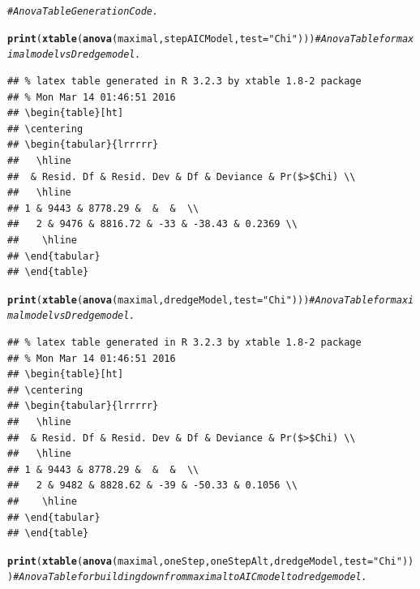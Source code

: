 \documentclass{article}\usepackage[]{graphicx}\usepackage[]{color}
\makeatletter
\newcommand{\hlstr}[1]{\textcolor[rgb]{0.192,0.494,0.8}{#1}}%
\newcommand{\hlcom}[1]{\textcolor[rgb]{0.678,0.584,0.686}{\textit{#1}}}%
\newcommand{\hlstd}[1]{\textcolor[rgb]{0.345,0.345,0.345}{#1}}%
\newcommand{\hlkwc}[1]{\textcolor[rgb]{0.333,0.667,0.333}{#1}}%
\newcommand{\hlkwd}[1]{\textcolor[rgb]{0.737,0.353,0.396}{\textbf{#1}}}%
\newenvironment{kframe}{%
 \def\at@end@of@kframe{}%
 \ifinner\ifhmode%
  \def\at@end@of@kframe{\end{minipage}}%
  \begin{minipage}{\columnwidth}%
 \fi\fi%
 \def\FrameCommand##1{\hskip\@totalleftmargin \hskip-\fboxsep
 \colorbox{shadecolor}{##1}\hskip-\fboxsep
     \hskip-\linewidth \hskip-\@totalleftmargin \hskip\columnwidth}%
 \MakeFramed {\advance\hsize-\width
   \@totalleftmargin\z@ \linewidth\hsize
   \@setminipage}}%
 {\par\unskip\endMakeFramed%
 \at@end@of@kframe}
\newenvironment{knitrout}{}{} %
\makeatother
\begin{document}
\begin{knitrout}
\color{fgcolor}\begin{kframe}
\begin{alltt}
\hlcom{#Anova Table Generation Code. }

\hlkwd{print}\hlstd{(}\hlkwd{xtable}\hlstd{(}\hlkwd{anova}\hlstd{(maximal, stepAICModel,} \hlkwc{test}\hlstd{=}\hlstr{"Chi"}\hlstd{)))} \hlcom{#Anova Table for maximal model vs Dredge model. }
\end{alltt}
\begin{verbatim}
## % latex table generated in R 3.2.3 by xtable 1.8-2 package
## % Mon Mar 14 01:46:51 2016
## \begin{table}[ht]
## \centering
## \begin{tabular}{lrrrrr}
##   \hline
##  & Resid. Df & Resid. Dev & Df & Deviance & Pr($>$Chi) \\ 
##   \hline
## 1 & 9443 & 8778.29 &  &  &  \\ 
##   2 & 9476 & 8816.72 & -33 & -38.43 & 0.2369 \\ 
##    \hline
## \end{tabular}
## \end{table}
\end{verbatim}
\begin{alltt}
\hlkwd{print}\hlstd{(}\hlkwd{xtable}\hlstd{(}\hlkwd{anova}\hlstd{(maximal, dredgeModel,} \hlkwc{test}\hlstd{=}\hlstr{"Chi"}\hlstd{)))} \hlcom{#Anova Table for maximal model vs Dredge model. }
\end{alltt}
\begin{verbatim}
## % latex table generated in R 3.2.3 by xtable 1.8-2 package
## % Mon Mar 14 01:46:51 2016
## \begin{table}[ht]
## \centering
## \begin{tabular}{lrrrrr}
##   \hline
##  & Resid. Df & Resid. Dev & Df & Deviance & Pr($>$Chi) \\ 
##   \hline
## 1 & 9443 & 8778.29 &  &  &  \\ 
##   2 & 9482 & 8828.62 & -39 & -50.33 & 0.1056 \\ 
##    \hline
## \end{tabular}
## \end{table}
\end{verbatim}
\begin{alltt}
\hlkwd{print}\hlstd{(}\hlkwd{xtable}\hlstd{(}\hlkwd{anova}\hlstd{(maximal, oneStep, oneStepAlt, dredgeModel,} \hlkwc{test}\hlstd{=}\hlstr{"Chi"}\hlstd{)))} \hlcom{#Anova Table for building down from maximal to AICmodel to dredge model.  }

\end{alltt}
\end{kframe}
\end{knitrout}
\end{document}
